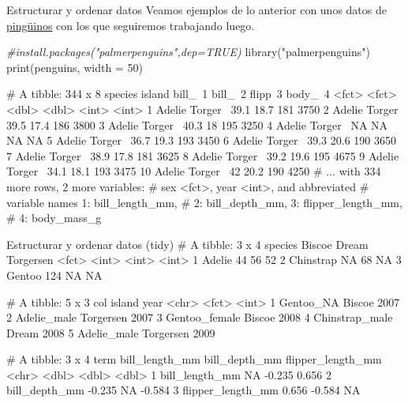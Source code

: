 \documentclass[
  ignorenonframetext,
  aspectratio=169]{beamer}
\newenvironment{Shaded}{\begin{snugshade}}{\end{snugshade}}
\newcommand{\AttributeTok}[1]{\textcolor[rgb]{0.77,0.63,0.00}{#1}}
\newcommand{\CommentTok}[1]{\textcolor[rgb]{0.56,0.35,0.01}{\textit{#1}}}
\newcommand{\DecValTok}[1]{\textcolor[rgb]{0.00,0.00,0.81}{#1}}
\newcommand{\FunctionTok}[1]{\textcolor[rgb]{0.00,0.00,0.00}{#1}}
\newcommand{\NormalTok}[1]{#1}
\newcommand{\StringTok}[1]{\textcolor[rgb]{0.31,0.60,0.02}{#1}}
\let\oldverbatim\verbatim
\let\endoldverbatim\endverbatim
\renewenvironment{verbatim}{\tiny\oldverbatim}{\endoldverbatim}
\begin{document}
\begin{frame}[fragile]{Estructurar y ordenar datos}
\protect\hypertarget{estructurar-y-ordenar-datos}{}
Veamos ejemplos de lo anterior con unos datos de
\href{https://allisonhorst.github.io/palmerpenguins/}{pingüinos} con los
que seguiremos trabajando luego.

\begin{Shaded}
\begin{Highlighting}[]
\CommentTok{\#install.packages("palmerpenguins",dep=TRUE)}
\FunctionTok{library}\NormalTok{(}\StringTok{"palmerpenguins"}\NormalTok{)}
\FunctionTok{print}\NormalTok{(penguins, }\AttributeTok{width =} \DecValTok{50}\NormalTok{)}
\end{Highlighting}
\end{Shaded}

\begin{verbatim}
# A tibble: 344 x 8
   species island  bill_~1 bill_~2 flipp~3 body_~4
   <fct>   <fct>     <dbl>   <dbl>   <int>   <int>
 1 Adelie  Torger~    39.1    18.7     181    3750
 2 Adelie  Torger~    39.5    17.4     186    3800
 3 Adelie  Torger~    40.3    18       195    3250
 4 Adelie  Torger~    NA      NA        NA      NA
 5 Adelie  Torger~    36.7    19.3     193    3450
 6 Adelie  Torger~    39.3    20.6     190    3650
 7 Adelie  Torger~    38.9    17.8     181    3625
 8 Adelie  Torger~    39.2    19.6     195    4675
 9 Adelie  Torger~    34.1    18.1     193    3475
10 Adelie  Torger~    42      20.2     190    4250
# ... with 334 more rows, 2 more variables:
#   sex <fct>, year <int>, and abbreviated
#   variable names 1: bill_length_mm,
#   2: bill_depth_mm, 3: flipper_length_mm,
#   4: body_mass_g
\end{verbatim}
\end{frame}

\begin{frame}[fragile]{Estructurar y ordenar datos (tidy)}
\protect\hypertarget{estructurar-y-ordenar-datos-tidy-1}{}
\begin{verbatim}
# A tibble: 3 x 4
  species   Biscoe Dream Torgersen
  <fct>      <int> <int>     <int>
1 Adelie        44    56        52
2 Chinstrap     NA    68        NA
3 Gentoo       124    NA        NA
\end{verbatim}

\begin{verbatim}
# A tibble: 5 x 3
  col            island     year
  <chr>          <fct>     <int>
1 Gentoo_NA      Biscoe     2007
2 Adelie_male    Torgersen  2007
3 Gentoo_female  Biscoe     2008
4 Chinstrap_male Dream      2008
5 Adelie_male    Torgersen  2009
\end{verbatim}

\begin{verbatim}
# A tibble: 3 x 4
  term              bill_length_mm bill_depth_mm flipper_length_mm
  <chr>                      <dbl>         <dbl>             <dbl>
1 bill_length_mm            NA            -0.235             0.656
2 bill_depth_mm             -0.235        NA                -0.584
3 flipper_length_mm          0.656        -0.584            NA    
\end{verbatim}
\end{frame}
\end{document}
